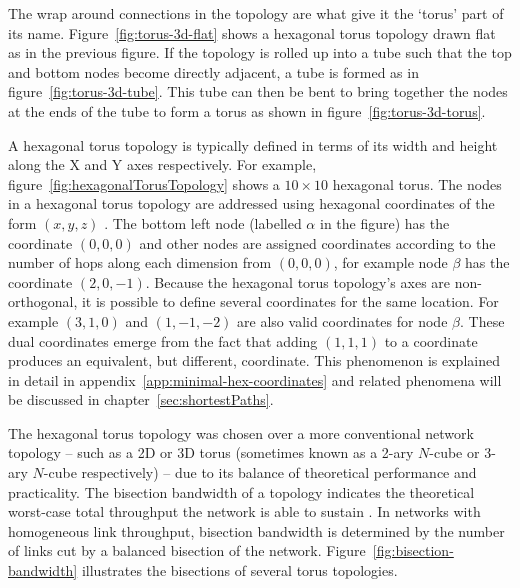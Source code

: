 		The wrap around connections in the topology are what give it the `torus'
		part of its name. Figure~\ref{fig:torus-3d-flat} shows a hexagonal torus
		topology drawn flat as in the previous figure. If the topology is rolled up
		into a tube such that the top and bottom nodes become directly adjacent, a
		tube is formed as in figure~\ref{fig:torus-3d-tube}. This tube can then be
		bent to bring together the nodes at the ends of the tube to form a torus as
		shown in figure~\ref{fig:torus-3d-torus}.
		
		A hexagonal torus topology is typically defined in terms of its width and
		height along the X and Y axes respectively. For example,
		figure~\ref{fig:hexagonalTorusTopology} shows a $10\times10$ hexagonal
		torus.  The nodes in a hexagonal torus topology are addressed using
		hexagonal coordinates of the form $(x, y, z)$ \cite{patel15}. The bottom
		left node (labelled $\alpha$ in the figure) has the coordinate $(0, 0, 0)$
		and other nodes are assigned coordinates according to the number of hops
		along each dimension from $(0, 0, 0)$, for example node $\beta$ has the
		coordinate $(2, 0, -1)$. Because the hexagonal torus topology's axes are
		non-orthogonal, it is possible to define several coordinates for the same
		location. For example $(3, 1, 0)$ and $(1, -1, -2)$ are also valid
		coordinates for node $\beta$. These dual coordinates emerge from the fact
		that adding $(1, 1, 1)$ to a coordinate produces an equivalent, but
		different, coordinate. This phenomenon is explained in detail in
		appendix~\ref{app:minimal-hex-coordinates} and related phenomena will be
		discussed in chapter~\ref{sec:shortestPaths}.
		
		The hexagonal torus topology was chosen over a more conventional network
		topology -- such as a 2D or 3D torus (sometimes known as a 2-ary $N$-cube
		or 3-ary $N$-cube respectively) \cite[chapters~3~and~5]{dally04} -- due to
		its balance of theoretical performance and practicality. The bisection
		bandwidth of a topology indicates the theoretical worst-case total
		throughput the network is able to sustain \cite[chapter~1]{dally04}.  In
		networks with homogeneous link throughput, bisection bandwidth is
		determined by the number of links cut by a balanced bisection of the
		network.  Figure~\ref{fig:bisection-bandwidth} illustrates the bisections
		of several torus topologies.
		
